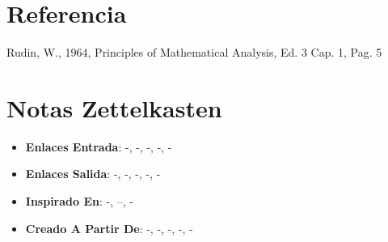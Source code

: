 \documentclass[12pt]{article}
\begin{document}
\section*{Referencia}
Rudin, W., 1964, Principles of Mathematical Analysis, Ed. 3 Cap. 1, Pag. 5 

\section*{Notas Zettelkasten}
\begin{itemize}
  \item \textbf{Enlaces Entrada}: -, -, -, -, -
  \item \textbf{Enlaces Salida}: -, -, -, -, -
  \item \textbf{Inspirado En}: -, --, -
  \item \textbf{Creado A Partir De}: -, -, -, -, -
\end{itemize}
\end{document}
